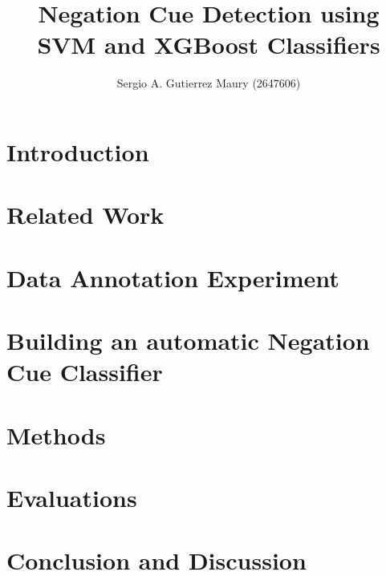 \documentclass[runningheads]{llncs}
\begin{document}
%
\title{Negation Cue Detection using SVM and XGBoost Classifiers}
%
%
\author{
Sergio A. Gutierrez Maury (2647606)
}
%
%
%
\maketitle              %

\begin{abstract}

\end{abstract}


\section*{Introduction}


\section*{Related Work}


\section*{Data Annotation Experiment}


\section*{Building an automatic Negation Cue Classifier}

\section*{Methods}

\section*{Evaluations}

\section*{Conclusion and Discussion}
\end{document}
